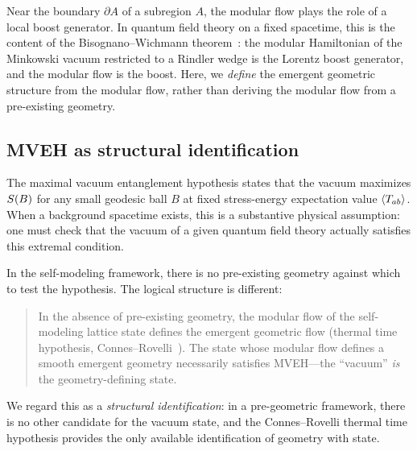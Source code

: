 Near the boundary $\partial A$ of a subregion $A$, the modular flow
plays the role of a local boost generator.  In quantum field theory on
a fixed spacetime, this is the content of the Bisognano--Wichmann
theorem~\cite{BisognanoWichmann1976}: the modular Hamiltonian of the
Minkowski vacuum restricted to a Rindler wedge is the Lorentz boost
generator, and the modular flow is the boost.  Here, we \emph{define}
the emergent geometric structure from the modular flow, rather than
deriving the modular flow from a pre-existing geometry.

\subsection{MVEH as structural identification}
\label{sec:mveh}

The maximal vacuum entanglement hypothesis states that the vacuum
maximizes $S(B)$ for any small geodesic ball $B$ at fixed
stress-energy expectation value $\langle T_{ab}\rangle$.  When a
background spacetime exists, this is a substantive physical
assumption: one must check that the vacuum of a given quantum field
theory actually satisfies this extremal condition.

In the self-modeling framework, there is no pre-existing geometry
against which to test the hypothesis.  The logical structure is
different:

\begin{quote}
In the absence of pre-existing geometry, the modular flow of the
self-modeling lattice state defines the emergent geometric flow
(thermal time hypothesis,
Connes--Rovelli~\cite{ConnesRovelli1994}).  The state whose
modular flow defines a smooth emergent geometry necessarily
satisfies MVEH---the ``vacuum'' \emph{is} the geometry-defining
state.
\end{quote}

We regard this as a \emph{structural identification}: in a pre-geometric
framework, there is no other candidate for the vacuum state, and the
Connes--Rovelli thermal time hypothesis provides the only available
identification of geometry with state.

